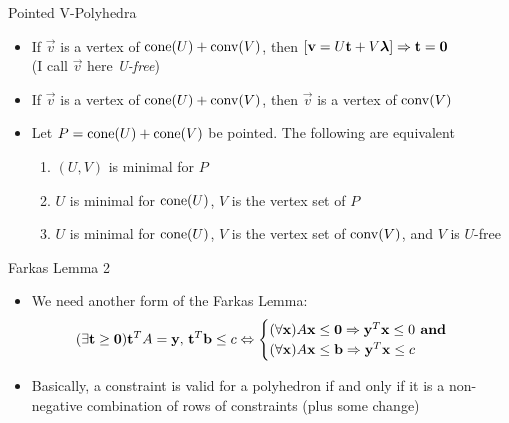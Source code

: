 \documentclass{beamer}
\begin{document}
\begin{frame}{Pointed V-Polyhedra}
\begin{itemize}
	\item<1-> If $\vec{v}$ is a vertex of $\operatorname{cone}(U) + \operatorname{conv}(V)$, then $[\mathbf{v} = U\mathbf{t} + V\bm{\lambda}] \Rightarrow \mathbf{t} = \mathbf{0}$  \\
  (I call $\vec{v}$ here \textit{U-free})
  \item<2-> If $\vec{v}$ is a vertex of $\operatorname{cone}(U) + \operatorname{conv}(V)$, then $\vec{v}$ is a vertex of $\operatorname{conv}(V)$
	\item<3-> Let $P = \operatorname{cone}(U)+ \operatorname{cone}(V)$ be pointed.  The following are equivalent
    \begin{enumerate}
      \item $(U,V)$ is minimal for $P$
      \item $U$ is minimal for $\operatorname{cone}(U)$, $V$ is the vertex set of $P$
      \item $U$ is minimal for $\operatorname{cone}(U)$, $V$ is the vertex set of $\operatorname{conv}(V)$, and $V$ is $U$-free
    \end{enumerate}

\end{itemize}
\end{frame}

\begin{frame}{Farkas Lemma 2}
\begin{itemize}
  \item<1-> We need another form of the Farkas Lemma:
      \[ (\exists \mathbf{t}\geq\mathbf{0}) \mathbf{t}^T A = \mathbf{y},\, \mathbf{t}^T\mathbf{b} \leq c \Leftrightarrow
        \begin{cases}
        (\forall \mathbf{x}) A\mathbf{x}\leq \mathbf{0} \Rightarrow \mathbf{y}^T\mathbf{x} \leq 0 \textbf{ and } \\
        (\forall \mathbf{x}) A\mathbf{x}\leq \mathbf{b} \Rightarrow \mathbf{y}^T\mathbf{x} \leq c
        \end{cases}
      \]
  \item<2-> Basically, a constraint is valid for a polyhedron if and only if it is a non-negative combination of rows of constraints (plus some change)
\end{itemize}
\end{frame}
\end{document}
